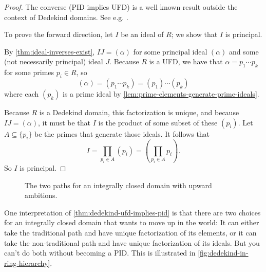 \begin{proof}
    The converse (PID implies UFD) is a well known result outside the context of Dedekind domains. See e.g. \textcite{dummit-foote}.

    To prove the forward direction, let $I$ be an ideal of $R$; we show that $I$ is principal.

    By \autoref{thm:ideal-inverses-exist}, $IJ = (\alpha)$ for some principal ideal $(\alpha)$ and some (not necessarily principal) ideal $J$. Because $R$ is a UFD, we have that $\alpha = p_1 \cdots p_k$ for some primes $p_i \in R$, so
    \begin{equation}
        (\alpha) = (p_1 \cdots p_k) = (p_1) \cdots (p_k)
    \end{equation}
    where each $(p_k)$ is a prime ideal by \autoref{lem:prime-elements-generate-prime-ideals}.

    Because $R$ is a Dedekind domain, this factorization is unique, and because $IJ =  (\alpha)$, it must be that $I$ is the product of some subset of these $(p_i)$.
    Let $A \subseteq \{ p_i \}$ be the primes that generate those ideals. It follows that
    \begin{equation}
        I
        = \prod_{p_i \in A} (p_i)
        = \left( \prod_{p_i \in A} p_i \right).
    \end{equation}
    So $I$ is principal.
\end{proof}

\begin{figure}
    \centering
    \caption{The two paths for an integrally closed domain with upward ambitions.}
    \label{fig:dedekind-in-ring-hierarchy}
\end{figure}

One interpretation of \autoref{thm:dedekind-ufd-implies-pid} is that there are two choices for an integrally closed domain that wants to move up in the world: It can either take the traditional path and have unique factorization of its elements, or it can take the non-traditional path and have unique factorization of its ideals. But you can't do both without becoming a PID. This is illustrated in \autoref{fig:dedekind-in-ring-hierarchy}.

